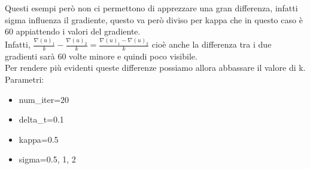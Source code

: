 Questi esempi però non ci permettono di apprezzare una gran differenza, infatti sigma influenza il gradiente, questo va però diviso per kappa che in questo caso è 60 appiattendo i valori del gradiente.\\
Infatti, $\frac{\nabla(u)_1}{k}-\frac{\nabla(u)_2}{k}=\frac{\nabla(u)_1-\nabla(u)_2}{k}$ cioè anche la differenza tra i due gradienti sarà 60 volte minore e quindi poco visibile.\\
Per rendere più evidenti queste differenze possiamo allora abbassare il valore di k.\\
Parametri:
\begin{itemize}
    \item num\_iter=20
    \item delta\_t=0.1
    \item kappa=0.5
    \item sigma=0.5, 1, 2
\end{itemize}

